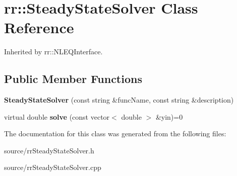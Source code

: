 \hypertarget{classrr_1_1_steady_state_solver}{\section{rr\-:\-:Steady\-State\-Solver Class Reference}
\label{classrr_1_1_steady_state_solver}
}


Inherited by rr\-::\-N\-L\-E\-Q\-Interface.

\subsection*{Public Member Functions}
\begin{DoxyCompactItemize}
\item 
\hypertarget{classrr_1_1_steady_state_solver_af74de03dbf79a1909dc2da4704288c1a}{{\bfseries Steady\-State\-Solver} (const string \&func\-Name, const string \&description)}\label{classrr_1_1_steady_state_solver_af74de03dbf79a1909dc2da4704288c1a}

\item 
\hypertarget{classrr_1_1_steady_state_solver_a61fe360e8fcfa5b588d9e447f93dab3b}{virtual double {\bfseries solve} (const vector$<$ double $>$ \&yin)=0}\label{classrr_1_1_steady_state_solver_a61fe360e8fcfa5b588d9e447f93dab3b}

\end{DoxyCompactItemize}


The documentation for this class was generated from the following files\-:\begin{DoxyCompactItemize}
\item 
source/rr\-Steady\-State\-Solver.\-h\item 
source/rr\-Steady\-State\-Solver.\-cpp\end{DoxyCompactItemize}
